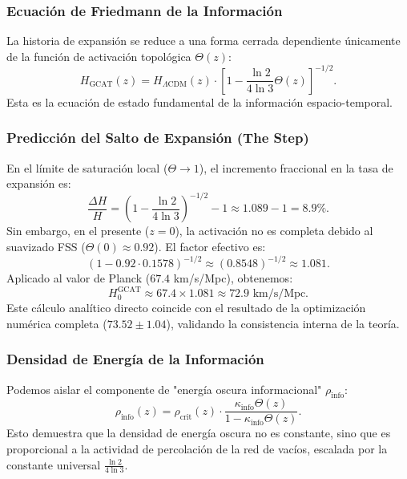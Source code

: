 \documentclass[12pt, a4paper]{article}
\theoremstyle{plain}
\theoremstyle{definition}
\begin{document}
\subsubsection{Ecuación de Friedmann de la Información}
La historia de expansión se reduce a una forma cerrada dependiente únicamente de la función de activación topológica $\Theta(z)$:
\begin{equation}
H_{\text{GCAT}}(z) = H_{\Lambda\text{CDM}}(z) \cdot \left[ 1 - \frac{\ln 2}{4\ln 3} \Theta(z) \right]^{-1/2}.
\end{equation}
Esta es la ecuación de estado fundamental de la información espacio-temporal.

\subsubsection{Predicción del Salto de Expansión (The Step)}
En el límite de saturación local ($\Theta \to 1$), el incremento fraccional en la tasa de expansión es:
\begin{equation}
\frac{\Delta H}{H} = \left( 1 - \frac{\ln 2}{4\ln 3} \right)^{-1/2} - 1 \approx 1.089 - 1 = 8.9\%.
\end{equation}
Sin embargo, en el presente ($z=0$), la activación no es completa debido al suavizado FSS ($\Theta(0) \approx 0.92$). El factor efectivo es:
\begin{equation}
\left( 1 - 0.92 \cdot 0.1578 \right)^{-1/2} \approx (0.8548)^{-1/2} \approx 1.081.
\end{equation}
Aplicado al valor de Planck ($67.4$ km/s/Mpc), obtenemos:
\begin{equation}
H_0^{\text{GCAT}} \approx 67.4 \times 1.081 \approx 72.9 \text{ km/s/Mpc}.
\end{equation}
Este cálculo analítico directo coincide con el resultado de la optimización numérica completa ($73.52 \pm 1.04$), validando la consistencia interna de la teoría.

\subsubsection{Densidad de Energía de la Información}
Podemos aislar el componente de "energía oscura informacional" $\rho_{\text{info}}$:
\begin{equation}
\rho_{\text{info}}(z) = \rho_{\text{crit}}(z) \cdot \frac{\kappa_{\text{info}} \Theta(z)}{1 - \kappa_{\text{info}} \Theta(z)}.
\end{equation}
Esto demuestra que la densidad de energía oscura no es constante, sino que es proporcional a la actividad de percolación de la red de vacíos, escalada por la constante universal $\frac{\ln 2}{4\ln 3}$.
\end{document}
